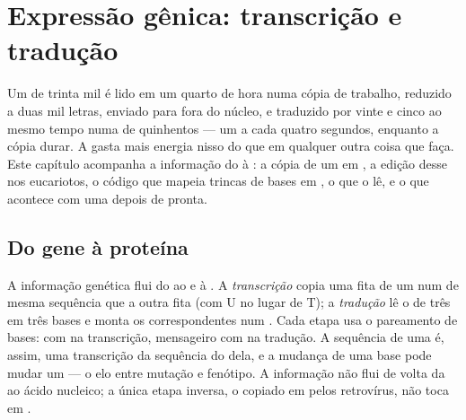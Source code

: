 \chapter{Expressão gênica: transcrição e tradução}\label{ch:b1:gene-expression}

Um  de trinta mil  é lido em um quarto de hora numa
cópia de trabalho, reduzido a duas mil letras, enviado para fora do
núcleo, e traduzido por vinte e cinco  ao mesmo tempo numa
 de quinhentos  --- um a cada quatro segundos,
enquanto a cópia durar. A  gasta mais energia nisso do que em
qualquer outra coisa que faça. Este capítulo acompanha a informação do
 à : a cópia de um  em , a edição desse  nos
eucariotos, o código que mapeia trincas de bases em , o
 que o lê, e o que acontece com uma  depois de pronta.

\section{Do gene à proteína}

\begin{proposition}\label{prop:b1:gene-expression:dogma}
A informação genética flui do  ao  e à . A
\emph{transcrição} copia uma fita de um  num  de mesma sequência
que a outra fita (com U no lugar de T); a \emph{tradução} lê o  de três em três bases e monta os  correspondentes
num . Cada etapa usa o pareamento de bases:  com  na
transcrição, mensageiro com  na tradução. A sequência
de uma  é, assim, uma transcrição da sequência do  dela, e a
mudança de uma base pode mudar um  --- o elo entre mutação e
fenótipo. A informação não flui de volta da  ao ácido nucleico;
a única etapa inversa, o  copiado em  pelos retrovírus, não toca
em .
\end{proposition}

